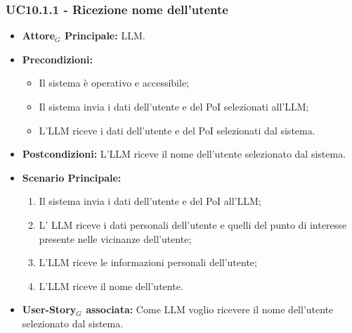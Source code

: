 \documentclass[11pt]{article}
\begin{document}
\begin{justify}
\subsubsection{\textbf{UC10.1.1 - Ricezione nome dell'utente}}
\begin{itemize}
    \item \textbf{Attore$_G$ Principale:} LLM.
    \item \textbf{Precondizioni:} 
        \begin{itemize}
          \item Il sistema è operativo e accessibile;
          \item Il sistema invia i dati dell'utente e del PoI selezionati all'LLM;
            \item L'LLM riceve i dati dell'utente e del PoI selezionati dal sistema.
        \end{itemize}
      \item \textbf{Postcondizioni:} L'LLM riceve il nome dell'utente selezionato dal sistema.
    \item \textbf{Scenario Principale:} 
        \begin{enumerate}
          \item Il sistema invia i dati dell'utente e del PoI all'LLM;
        \item L' LLM riceve i dati personali dell'utente e quelli del punto di interesse presente nelle vicinanze dell'utente;
          \item L'LLM riceve le informazioni personali dell'utente;
          \item L'LLM riceve il nome dell'utente.
        \end{enumerate}
      \item \textbf{User-Story$_G$ associata:} Come LLM voglio ricevere il nome dell'utente selezionato dal sistema.
\end{itemize}

\end{justify}
\end{document}
